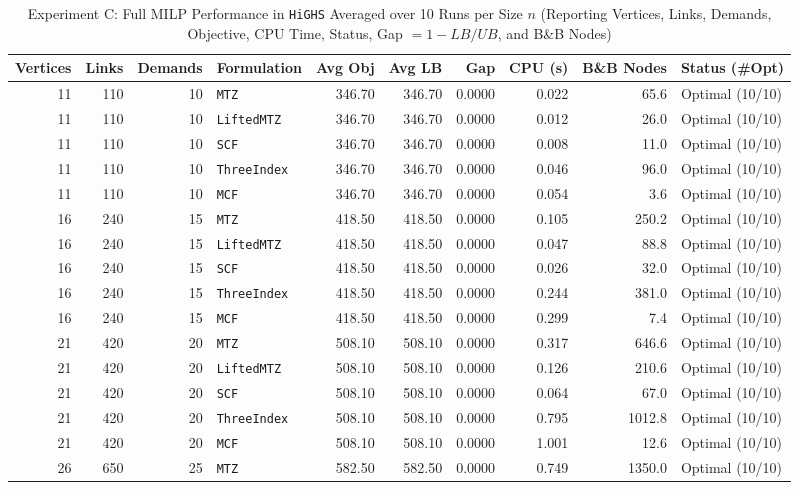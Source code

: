 \documentclass[11pt,a4paper]{article}
\begin{document}
\begin{table}[htbp]
\centering
\caption{Experiment C: Full MILP Performance in \texttt{HiGHS} Averaged over 10 Runs per Size $n$ (Reporting Vertices, Links, Demands, Objective, CPU Time, Status, Gap $= 1 - LB/UB$, and B\&B Nodes)}
\label{tab:highs_mip}
\footnotesize
\begin{tabular}{rrrlrrrrrl}
\toprule
Vertices & Links & Demands & Formulation & Avg Obj & Avg LB & Gap & CPU (s) & B\&B Nodes & Status (\#Opt) \\
\midrule
11 & 110 & 10 & \texttt{MTZ} & 346.70 & 346.70 & 0.0000 & 0.022 & 65.6 & Optimal (10/10) \\
11 & 110 & 10 & \texttt{LiftedMTZ} & 346.70 & 346.70 & 0.0000 & 0.012 & 26.0 & Optimal (10/10) \\
11 & 110 & 10 & \texttt{SCF} & 346.70 & 346.70 & 0.0000 & 0.008 & 11.0 & Optimal (10/10) \\
11 & 110 & 10 & \texttt{ThreeIndex} & 346.70 & 346.70 & 0.0000 & 0.046 & 96.0 & Optimal (10/10) \\
11 & 110 & 10 & \texttt{MCF} & 346.70 & 346.70 & 0.0000 & 0.054 & 3.6 & Optimal (10/10) \\
\midrule
16 & 240 & 15 & \texttt{MTZ} & 418.50 & 418.50 & 0.0000 & 0.105 & 250.2 & Optimal (10/10) \\
16 & 240 & 15 & \texttt{LiftedMTZ} & 418.50 & 418.50 & 0.0000 & 0.047 & 88.8 & Optimal (10/10) \\
16 & 240 & 15 & \texttt{SCF} & 418.50 & 418.50 & 0.0000 & 0.026 & 32.0 & Optimal (10/10) \\
16 & 240 & 15 & \texttt{ThreeIndex} & 418.50 & 418.50 & 0.0000 & 0.244 & 381.0 & Optimal (10/10) \\
16 & 240 & 15 & \texttt{MCF} & 418.50 & 418.50 & 0.0000 & 0.299 & 7.4 & Optimal (10/10) \\
\midrule
21 & 420 & 20 & \texttt{MTZ} & 508.10 & 508.10 & 0.0000 & 0.317 & 646.6 & Optimal (10/10) \\
21 & 420 & 20 & \texttt{LiftedMTZ} & 508.10 & 508.10 & 0.0000 & 0.126 & 210.6 & Optimal (10/10) \\
21 & 420 & 20 & \texttt{SCF} & 508.10 & 508.10 & 0.0000 & 0.064 & 67.0 & Optimal (10/10) \\
21 & 420 & 20 & \texttt{ThreeIndex} & 508.10 & 508.10 & 0.0000 & 0.795 & 1012.8 & Optimal (10/10) \\
21 & 420 & 20 & \texttt{MCF} & 508.10 & 508.10 & 0.0000 & 1.001 & 12.6 & Optimal (10/10) \\
\midrule
26 & 650 & 25 & \texttt{MTZ} & 582.50 & 582.50 & 0.0000 & 0.749 & 1350.0 & Optimal (10/10) \\

\end{tabular}
\end{table}
\end{document}
